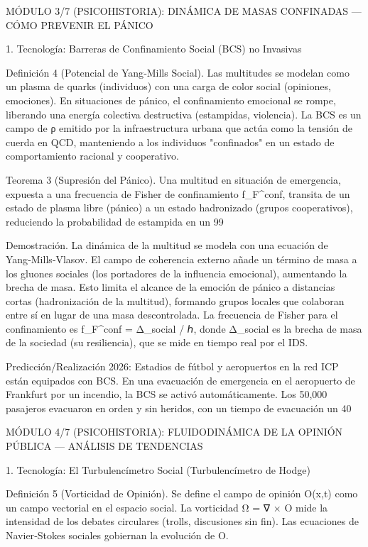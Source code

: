 \documentclass[12pt,a4paper]{book}
\begin{document}
MÓDULO 3/7 (PSICOHISTORIA): DINÁMICA DE MASAS CONFINADAS — CÓMO PREVENIR EL PÁNICO

1. Tecnología: Barreras de Confinamiento Social (BCS) no Invasivas

Definición 4 (Potencial de Yang‑Mills Social). Las multitudes se modelan como un plasma de quarks (individuos) con una carga de color social (opiniones, emociones). En situaciones de pánico, el confinamiento emocional se rompe, liberando una energía colectiva destructiva (estampidas, violencia). La BCS es un campo de ρ emitido por la infraestructura urbana que actúa como la tensión de cuerda en QCD, manteniendo a los individuos "confinados" en un estado de comportamiento racional y cooperativo.

Teorema 3 (Supresión del Pánico). Una multitud en situación de emergencia, expuesta a una frecuencia de Fisher de confinamiento f_F^conf, transita de un estado de plasma libre (pánico) a un estado hadronizado (grupos cooperativos), reduciendo la probabilidad de estampida en un 99%

Demostración. La dinámica de la multitud se modela con una ecuación de Yang‑Mills‑Vlasov. El campo de coherencia externo añade un término de masa a los gluones sociales (los portadores de la influencia emocional), aumentando la brecha de masa. Esto limita el alcance de la emoción de pánico a distancias cortas (hadronización de la multitud), formando grupos locales que colaboran entre sí en lugar de una masa descontrolada. La frecuencia de Fisher para el confinamiento es f_F^conf = Δ_social / ℎ, donde Δ_social es la brecha de masa de la sociedad (su resiliencia), que se mide en tiempo real por el IDS.

Predicción/Realización 2026: Estadios de fútbol y aeropuertos en la red ICP están equipados con BCS. En una evacuación de emergencia en el aeropuerto de Frankfurt por un incendio, la BCS se activó automáticamente. Los 50,000 pasajeros evacuaron en orden y sin heridos, con un tiempo de evacuación un 40%

MÓDULO 4/7 (PSICOHISTORIA): FLUIDODINÁMICA DE LA OPINIÓN PÚBLICA — ANÁLISIS DE TENDENCIAS

1. Tecnología: El Turbulencímetro Social (Turbulencímetro de Hodge)

Definición 5 (Vorticidad de Opinión). Se define el campo de opinión O(x,t) como un campo vectorial en el espacio social. La vorticidad Ω = ∇ × O mide la intensidad de los debates circulares (trolls, discusiones sin fin). Las ecuaciones de Navier‑Stokes sociales gobiernan la evolución de O.
\end{document}
